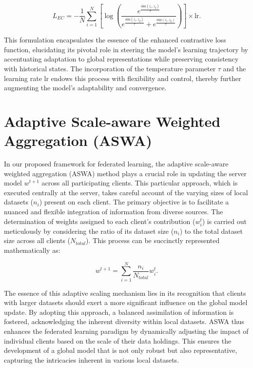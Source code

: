 \begin{equation} \label{eq: Enhanced Contrastive loss}
    L_{EC} = -\frac{1}{N} \sum_{i=1}^{N} \left[ \log\left( \frac{e^{\frac{\text{sim}(z_c, z_g)}{\tau}}}{e^{\frac{\text{sim}(z_c, z_g)}{\tau}} + e^{\frac{\text{sim}(z_c, z_p)}{\tau}}} \right) \right] \times \text{lr}.
\end{equation}

This formulation encapsulates the essence of the enhanced contrastive loss function, elucidating its pivotal role in steering the model's learning trajectory by accentuating adaptation to global representations while preserving consistency with historical states. The incorporation of the temperature parameter \(\tau\) and the learning rate \(\text{lr}\) endows this process with flexibility and control, thereby further augmenting the model's adaptability and convergence.

\section{Adaptive Scale-aware Weighted Aggregation (ASWA)}
In our proposed framework for federated learning, the adaptive scale-aware weighted aggregation (ASWA) method plays a crucial role in updating the server model \(w^{t+1}\) across all participating clients. This particular approach, which is executed centrally at the server, takes careful account of the varying sizes of local datasets (\(n_i\)) present on each client. The primary objective is to facilitate a nuanced and flexible integration of information from diverse sources. The determination of weights assigned to each client's contribution (\(w_i^t\)) is carried out meticulously by considering the ratio of its dataset size (\(n_i\)) to the total dataset size across all clients (\(N_{total}\)). This process can be succinctly represented mathematically as:

\begin{equation} \label{Eq: WEight update Equation}
    w^{t+1} = \sum_{i=1}^N \frac{n_i}{N_{total}} w_i^t.
\end{equation}

The essence of this adaptive scaling mechanism lies in its recognition that clients with larger datasets should exert a more significant influence on the global model update. By adopting this approach, a balanced assimilation of information is fostered, acknowledging the inherent diversity within local datasets. ASWA thus enhances the federated learning paradigm by dynamically adjusting the impact of individual clients based on the scale of their data holdings. This ensures the development of a global model that is not only robust but also representative, capturing the intricacies inherent in various local datasets.
